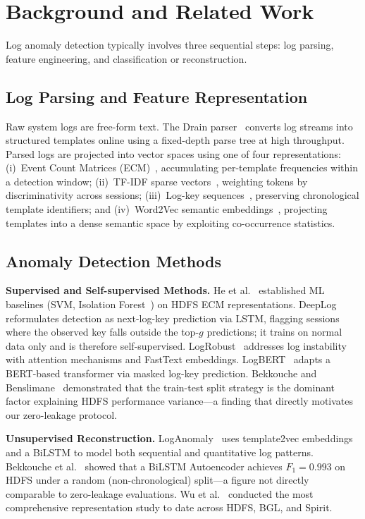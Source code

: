 \documentclass{elektr}
\begin{document}
\section{Background and Related Work}
\label{Sec:Related}

Log anomaly detection typically involves three sequential steps: log parsing,
feature engineering, and classification or reconstruction.

\subsection{Log Parsing and Feature Representation}

Raw system logs are free-form text. The Drain parser~\cite{ref6} converts log
streams into structured templates online using a fixed-depth parse tree at high
throughput. Parsed logs are projected into vector spaces using one of four
representations: (i)~Event Count Matrices (ECM)~\cite{ref4}, accumulating
per-template frequencies within a detection window; (ii)~TF-IDF sparse
vectors~\cite{ref1}, weighting tokens by discriminativity across sessions;
(iii)~Log-key sequences~\cite{ref5}, preserving chronological template identifiers;
and (iv)~Word2Vec semantic embeddings~\cite{ref2}, projecting templates into a
dense semantic space by exploiting co-occurrence statistics.

\subsection{Anomaly Detection Methods}

\textbf{Supervised and Self-supervised Methods.}
He et al.~\cite{ref4} established ML baselines (SVM, Isolation Forest~\cite{ref12}) on
HDFS ECM representations. DeepLog~\cite{ref5} reformulates detection as next-log-key
prediction via LSTM, flagging sessions where the observed key falls outside the
top-$g$ predictions; it trains on normal data only and is therefore self-supervised.
LogRobust~\cite{ref17} addresses log instability with
attention mechanisms and FastText embeddings. LogBERT~\cite{ref18} adapts a
BERT-based transformer via masked log-key prediction. Bekkouche and Benslimane~\cite{ref1}
demonstrated that the train-test split strategy is the dominant factor explaining
HDFS performance variance---a finding that directly motivates our zero-leakage
protocol.

\textbf{Unsupervised Reconstruction.}
LogAnomaly~\cite{ref7} uses template2vec embeddings and a BiLSTM to model
both sequential and quantitative log patterns. Bekkouche et al.~\cite{ref2}
showed that a BiLSTM Autoencoder achieves $F_1{=}0.993$ on HDFS under a random
(non-chronological) split---a figure not directly comparable to zero-leakage evaluations. Wu et al.~\cite{ref8} conducted the most comprehensive representation
study to date across HDFS, BGL, and Spirit.
\end{document}
